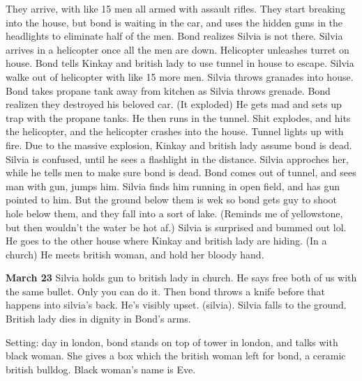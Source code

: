 \documentclass{article}
\begin{document}
    They arrive, with like 15 men all armed with assault rifles. They start breaking into the house,
    but bond is waiting in the  car, and uses the hidden guns in the headlights to eliminate half of the men.
    Bond realizes Silvia is not there. Silvia arrives in a helicopter once all the men
    are down. Helicopter unleashes turret on house. Bond tells Kinkay and british lady to use
    tunnel in house to escape. Silvia walke out of helicopter with like 15 more men.
    Silvia throws granades into house. Bond takes propane tank away from kitchen as Silvia throws grenade.
    Bond realizen they destroyed his beloved car. (It exploded) He gets mad and sets up trap with the propane tanks. He then runs in the tunnel.
    Shit explodes, and hits the helicopter, and the helicopter crashes into the house.
    Tunnel lights up with fire. Due to the massive explosion, Kinkay and british lady assume bond is dead.
    Silvia is confused, until he sees a flashlight in the distance. Silvia approches her, while he tells men to
    make sure bond is dead. Bond comes out of tunnel, and sees man with gun, jumps him. Silvia finds him running in
    open field, and has gun pointed to him. But the ground below them is wek so bond gets guy to shoot hole below them,
    and they fall into a sort of lake. (Reminds me of yellowstone, but then wouldn't the water be hot af.)
    Silvia is surprised and bummed out lol. He goes to the other house where Kinkay and british lady are hiding. (In a church)
    He meets british woman, and hold her bloody hand.

    \textbf{March 23}
    Silvia holds gun to british lady in church. He says free both of us with the same bullet.
    Only you can do it. Then bond throws a knife before that happens into silvia's back.
    He's visibly upset. (silvia). Silvia falls to the ground. British lady dies in dignity in Bond's arms.

    Setting: day in london, bond stands on top of tower in london, and talks with black woman.
    She gives a box which the british woman left for bond, a ceramic british bulldog.
    Black woman's name is Eve.
\end{document}
